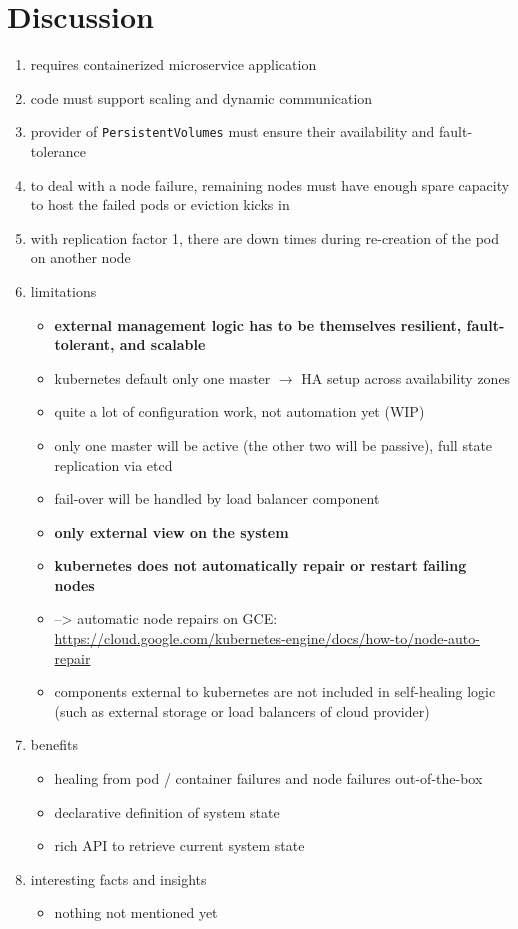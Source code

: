
\section{Discussion}\label{sec:discussion}
  \begin{enumerate}
    \item requires containerized microservice application
    \item code must support scaling and dynamic communication
    \item provider of \texttt{PersistentVolumes} must ensure their availability and fault-tolerance
    \item to deal with a node failure, remaining nodes must have enough spare capacity to host the failed pods or eviction kicks in
    \item with replication factor 1, there are down times during re-creation of the pod on another node
    \item limitations
    \begin{itemize}
      \item \textbf{external management logic has to be themselves resilient, fault-tolerant, and scalable}
      \item \gls{kubernetes} default only one master $\rightarrow$ HA setup across availability zones
      \item quite a lot of configuration work, not automation yet (WIP)
      \item only one master will be active (the other two will be passive), full state replication via etcd
      \item fail-over will be handled by load balancer component
      \item \textbf{only external view on the system}
      \item \textbf{\gls{kubernetes} does not automatically repair or restart failing nodes}
      \item --> automatic node repairs on GCE: \url{https://cloud.google.com/kubernetes-engine/docs/how-to/node-auto-repair}
      \item components external to \gls{kubernetes} are not included in self-healing logic (such as external storage or load balancers of cloud provider)
    \end{itemize}
    \item benefits
    \begin{itemize}
      \item healing from pod / container failures and node failures out-of-the-box
      \item declarative definition of system state
      \item rich API to retrieve current system state
    \end{itemize}
    \item interesting facts and insights
      \begin{itemize}
        \item nothing not mentioned yet
      \end{itemize}
  \end{enumerate}